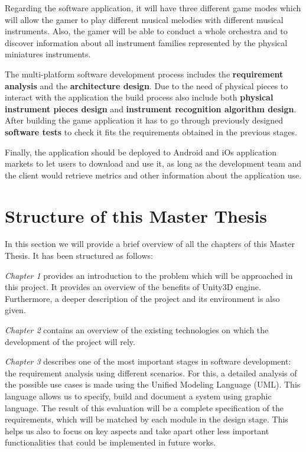 Regarding the software application, it will have three different game modes which will allow the gamer to play different musical melodies with different musical instruments. Also, the gamer will be able to conduct a whole orchestra and to discover information about all instrument families represented by the physical miniatures instruments.

The multi-platform software development process includes the \textbf{requirement analysis} and the \textbf{architecture design}. Due to the need of physical pieces to interact with the application the build process also include both \textbf{physical instrument pieces design} and \textbf{instrument recognition algorithm design}. After building the game application it has to go through previously designed \textbf{software tests} to check it fits the requirements obtained in the previous stages.

Finally, the application should be deployed to Android and iOs application markets to let users to download and use it, as long as the development team and the client would retrieve metrics and other information about the application use.


\section{Structure of this Master Thesis}

In this section we will provide a brief overview of all the chapters of this Master Thesis. It
has been structured as follows:

\textit{Chapter 1} provides an introduction to the problem which will be approached in this project. It provides an overview of the benefits of Unity3D engine. Furthermore, a deeper description of the project and its environment is also given.

\textit{Chapter 2} contains an overview of the existing technologies on which the development of the project will rely.

\textit{Chapter 3} describes one of the most important stages in software development: the requirement analysis using different scenarios. For this, a detailed analysis of the possible use cases is made using the Unified Modeling Language (UML). This language allows us to specify, build and document a system using graphic language.
The result of this evaluation will be a complete specification of the requirements, which will be matched by each module in the design stage. This helps us also to focus on key aspects and take apart other less important functionalities that could be implemented in future works.

